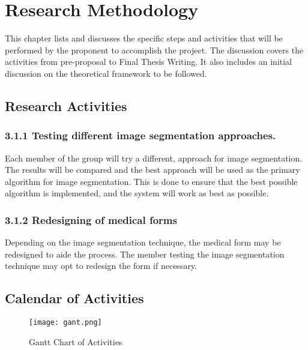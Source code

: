 %
%
%                 

\chapter{Research Methodology}
This chapter lists and discusses the specific steps and activities that will be performed by the proponent to accomplish the project. 
The discussion covers the activities from pre-proposal to Final Thesis Writing.  It also includes an initial discussion on the theoretical
framework to be followed.

\section{Research Activities}

\subsection*{3.1.1 Testing different image segmentation approaches.}


Each member of the group will try a different, approach for image segmentation. The results will be compared and the best approach will be used as the primary algorithm for image segmentation. This is done to ensure that the best possible algorithm is implemented, and the system will work as best as possible.

\subsection*{3.1.2 Redesigning of medical forms}

Depending on the image segmentation technique, the medical form may be redesigned to aide the process. The member testing the image segmentation technique may opt to redesign the form if necessary. 

\section{Calendar of Activities}

\begin{figure}[h]                %
	\centering                    %
	\texttt{[image: gant.png]}      %
	\caption{Gantt Chart of Activities}
	\label{fig:disneystock}
\end{figure}





